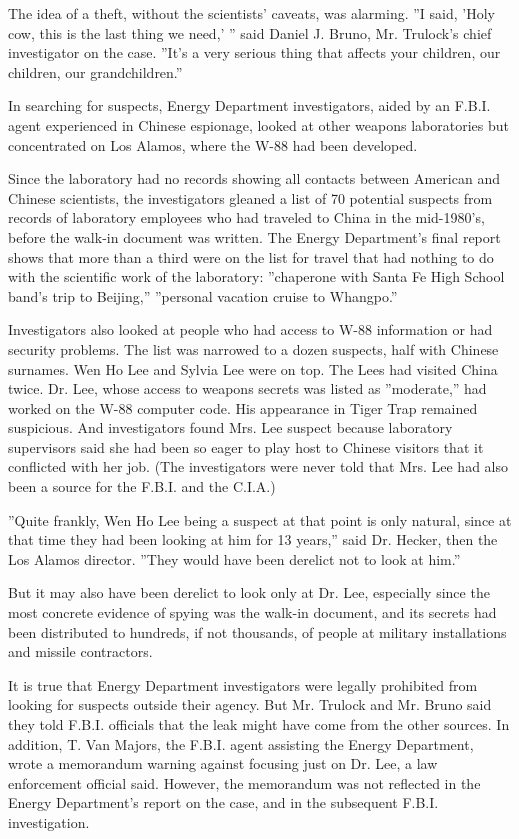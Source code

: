 The idea of a theft, without the scientists' caveats, was alarming. ''I
said, 'Holy cow, this is the last thing we need,' '' said Daniel J.
Bruno, Mr. Trulock's chief investigator on the case. ''It's a very
serious thing that affects your children, our children, our
grandchildren.''

In searching for suspects, Energy Department investigators, aided by an
F.B.I. agent experienced in Chinese espionage, looked at other weapons
laboratories but concentrated on Los Alamos, where the W-88 had been
developed.

Since the laboratory had no records showing all contacts between
American and Chinese scientists, the investigators gleaned a list of 70
potential suspects from records of laboratory employees who had traveled
to China in the mid-1980's, before the walk-in document was written. The
Energy Department's final report shows that more than a third were on
the list for travel that had nothing to do with the scientific work of
the laboratory: ''chaperone with Santa Fe High School band's trip to
Beijing,'' ''personal vacation cruise to Whangpo.''

Investigators also looked at people who had access to W-88 information
or had security problems. The list was narrowed to a dozen suspects,
half with Chinese surnames. Wen Ho Lee and Sylvia Lee were on top. The
Lees had visited China twice. Dr. Lee, whose access to weapons secrets
was listed as ''moderate,'' had worked on the W-88 computer code. His
appearance in Tiger Trap remained suspicious. And investigators found
Mrs. Lee suspect because laboratory supervisors said she had been so
eager to play host to Chinese visitors that it conflicted with her job.
(The investigators were never told that Mrs. Lee had also been a source
for the F.B.I. and the C.I.A.)

''Quite frankly, Wen Ho Lee being a suspect at that point is only
natural, since at that time they had been looking at him for 13 years,''
said Dr. Hecker, then the Los Alamos director. ''They would have been
derelict not to look at him.''

But it may also have been derelict to look only at Dr. Lee, especially
since the most concrete evidence of spying was the walk-in document, and
its secrets had been distributed to hundreds, if not thousands, of
people at military installations and missile contractors.

It is true that Energy Department investigators were legally prohibited
from looking for suspects outside their agency. But Mr. Trulock and Mr.
Bruno said they told F.B.I. officials that the leak might have come from
the other sources. In addition, T. Van Majors, the F.B.I. agent
assisting the Energy Department, wrote a memorandum warning against
focusing just on Dr. Lee, a law enforcement official said. However, the
memorandum was not reflected in the Energy Department's report on the
case, and in the subsequent F.B.I. investigation.

